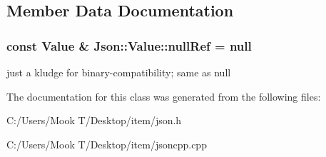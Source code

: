 \subsection{Member Data Documentation}
\hypertarget{class_json_1_1_value_aaa4ffd4e53967170c3e8c9abf682b5cd}{}
\subsubsection[{null\+Ref}]{\setlength{\rightskip}{0pt plus 5cm}const {\bf Value} \& Json\+::\+Value\+::null\+Ref = {\bf null}\hspace{0.3cm}{\ttfamily [static]}}\label{class_json_1_1_value_aaa4ffd4e53967170c3e8c9abf682b5cd}
just a kludge for binary-\/compatibility; same as null 

The documentation for this class was generated from the following files\+:\begin{DoxyCompactItemize}
\item 
C\+:/\+Users/\+Mook T/\+Desktop/item/json.\+h\item 
C\+:/\+Users/\+Mook T/\+Desktop/item/jsoncpp.\+cpp\end{DoxyCompactItemize}
